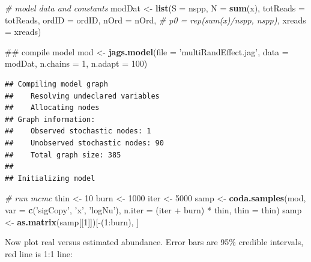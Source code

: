 \documentclass[]{article}
\newenvironment{Shaded}{\begin{snugshade}}{\end{snugshade}}
\newcommand{\KeywordTok}[1]{\textcolor[rgb]{0.13,0.29,0.53}{\textbf{{#1}}}}
\newcommand{\DataTypeTok}[1]{\textcolor[rgb]{0.13,0.29,0.53}{{#1}}}
\newcommand{\DecValTok}[1]{\textcolor[rgb]{0.00,0.00,0.81}{{#1}}}
\newcommand{\StringTok}[1]{\textcolor[rgb]{0.31,0.60,0.02}{{#1}}}
\newcommand{\CommentTok}[1]{\textcolor[rgb]{0.56,0.35,0.01}{\textit{{#1}}}}
\newcommand{\NormalTok}[1]{{#1}}
\begin{document}
\begin{Shaded}
\begin{Highlighting}[]
\CommentTok{# model data and constants}
\NormalTok{modDat <-}\StringTok{ }\KeywordTok{list}\NormalTok{(}\DataTypeTok{S =} \NormalTok{nspp, }\DataTypeTok{N =} \KeywordTok{sum}\NormalTok{(x), }
               \DataTypeTok{totReads =} \NormalTok{totReads, }\DataTypeTok{ordID =} \NormalTok{ordID, }\DataTypeTok{nOrd =} \NormalTok{nOrd,}
               \CommentTok{# p0 = rep(sum(x)/nspp, nspp), }
               \DataTypeTok{xreads =} \NormalTok{xreads)}

\NormalTok{## compile model}
\NormalTok{mod <-}\StringTok{ }\KeywordTok{jags.model}\NormalTok{(}\DataTypeTok{file =} \StringTok{'multiRandEffect.jag'}\NormalTok{,}
                  \DataTypeTok{data =} \NormalTok{modDat,}
                  \DataTypeTok{n.chains =} \DecValTok{1}\NormalTok{,}
                  \DataTypeTok{n.adapt =} \DecValTok{100}\NormalTok{)}
\end{Highlighting}
\end{Shaded}

\begin{verbatim}
## Compiling model graph
##    Resolving undeclared variables
##    Allocating nodes
## Graph information:
##    Observed stochastic nodes: 1
##    Unobserved stochastic nodes: 90
##    Total graph size: 385
## 
## Initializing model
\end{verbatim}

\begin{Shaded}
\begin{Highlighting}[]
\CommentTok{# run mcmc}
\NormalTok{thin <-}\StringTok{ }\DecValTok{10}
\NormalTok{burn <-}\StringTok{ }\DecValTok{1000}
\NormalTok{iter <-}\StringTok{ }\DecValTok{5000}
\NormalTok{samp <-}\StringTok{ }\KeywordTok{coda.samples}\NormalTok{(mod,}
                         \DataTypeTok{var =} \KeywordTok{c}\NormalTok{(}\StringTok{'sigCopy'}\NormalTok{, }\StringTok{'x'}\NormalTok{, }\StringTok{'logNu'}\NormalTok{),}
                         \DataTypeTok{n.iter =} \NormalTok{(iter +}\StringTok{ }\NormalTok{burn) *}\StringTok{ }\NormalTok{thin,}
                         \DataTypeTok{thin =} \NormalTok{thin)}
\NormalTok{samp <-}\StringTok{ }\KeywordTok{as.matrix}\NormalTok{(samp[[}\DecValTok{1}\NormalTok{]])[-(}\DecValTok{1}\NormalTok{:burn), ]}
\end{Highlighting}
\end{Shaded}

Now plot real versus estimated abundance. Error bars are 95\% credible
intervals, red line is 1:1 line:
\end{document}
